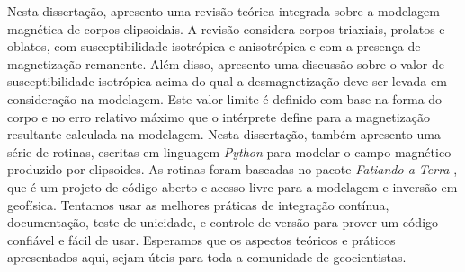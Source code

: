 Nesta dissertação, apresento uma revisão teórica integrada sobre a modelagem magnética de corpos elipsoidais. A revisão considera corpos triaxiais, prolatos e oblatos, com susceptibilidade isotrópica e anisotrópica e com a presença de magnetização remanente. Além disso, apresento uma discussão sobre o valor de susceptibilidade isotrópica acima do qual a desmagnetização deve ser levada em consideração na modelagem. Este valor limite é definido com base na forma do corpo e no erro relativo máximo que o intérprete define para a magnetização resultante calculada na modelagem. Nesta dissertação, também apresento uma série de rotinas, escritas em linguagem \textit{Python} para modelar o campo magnético produzido por elipsoides. As rotinas foram baseadas no pacote \textit{Fatiando a Terra} \citep{uieda-proc-scipy-2013}, que é um projeto de código aberto e acesso livre para a modelagem e inversão em geofísica. Tentamos usar as melhores práticas de integração contínua, documentação, teste de unicidade, e controle de versão para prover um código confiável e fácil de usar. Esperamos que os aspectos teóricos e práticos apresentados aqui, sejam úteis para toda a comunidade de geocientistas.
